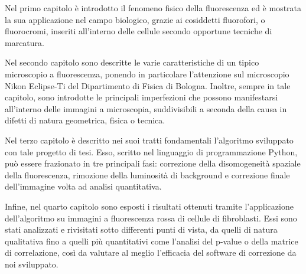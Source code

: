 Nel primo capitolo è introdotto il fenomeno fisico della fluorescenza ed è mostrata la sua applicazione nel campo biologico, grazie ai cosiddetti fluorofori, o fluorocromi, inseriti all'interno delle cellule secondo opportune tecniche di marcatura.

Nel secondo capitolo sono descritte le varie caratteristiche di un tipico microscopio a fluorescenza, ponendo in particolare l'attenzione sul microscopio Nikon Eclipse-Ti del Dipartimento di Fisica di Bologna. 
Inoltre, sempre in tale capitolo, sono introdotte le principali imperfezioni che possono manifestarsi all'interno delle immagini a microscopia, suddivisibili a seconda della causa in difetti di natura geometrica, fisica o tecnica.

Nel terzo capitolo è descritto nei suoi tratti fondamentali l'algoritmo sviluppato con tale progetto di tesi. 
Esso, scritto nel linguaggio di programmazione Python, può essere frazionato in tre principali fasi: correzione della disomogeneità spaziale della fluorescenza, rimozione della luminosità di background e correzione finale dell'immagine volta ad analisi quantitativa.

Infine, nel quarto capitolo sono esposti i risultati ottenuti tramite l'applicazione dell'algoritmo su immagini a fluorescenza rossa di cellule di fibroblasti.
Essi sono stati analizzati e rivisitati sotto differenti punti di vista, da quelli di natura qualitativa fino a quelli più quantitativi come l'analisi del p-value o della matrice di correlazione, così da valutare al meglio l'efficacia del software di correzione da noi sviluppato.

